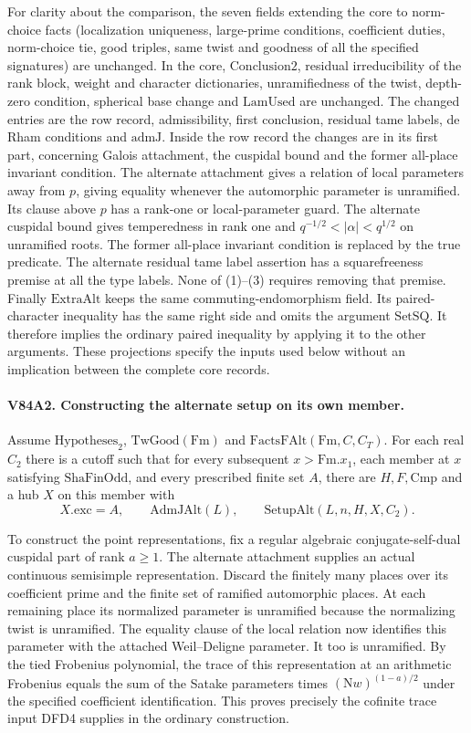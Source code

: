 For clarity about the comparison, the seven fields extending the
core to norm-choice facts (localization uniqueness, large-prime
conditions, coefficient duties, norm-choice tie, good triples, same
twist and goodness of all the specified signatures) are unchanged.
In the core, $\mathrm{Conclusion2}$, residual irreducibility of the
rank block, weight and character dictionaries, unramifiedness of
the twist, depth-zero condition, spherical base change and
$\mathrm{LamUsed}$ are unchanged. The changed entries are the
row record, admissibility, first conclusion, residual tame labels,
de Rham conditions and $\mathrm{admJ}$. Inside the row record
the changes are in its first part, concerning Galois attachment,
the cuspidal bound and the former all-place invariant condition.
The alternate attachment gives a relation of local parameters
away from $p$, giving equality whenever the automorphic parameter
is unramified. Its clause above $p$ has a rank-one or local-parameter
guard. The alternate cuspidal bound gives temperedness in rank one
and $q^{-1/2}<|\alpha|<q^{1/2}$ on unramified roots. The former
all-place invariant condition is replaced by the true predicate.
The alternate residual tame label assertion has a squarefreeness
premise at all the type labels. None of (1)--(3) requires removing
that premise. Finally $\mathrm{ExtraAlt}$ keeps the same
commuting-endomorphism field. Its paired-character inequality
has the same right side and omits the argument $\mathrm{SetSQ}$.
It therefore implies the ordinary paired inequality by applying
it to the other arguments. These projections specify the inputs
used below without an implication between the complete core records.

\paragraph{V84A2. Constructing the alternate setup on its own member.}
Assume $\mathrm{Hypotheses}_2$, $\mathrm{TwGood}(\mathrm{Fm})$ and
$\mathrm{FactsFAlt}(\mathrm{Fm},C,C_T)$. For each real $C_2$ there is
a cutoff such that for every subsequent $x>\mathrm{Fm}.x_1$, each
member at $x$ satisfying $\mathrm{ShaFinOdd}$, and every prescribed
finite set $A$, there are $H,F,\mathrm{Cmp}$ and a hub $X$ on this
member with
\[
 X.\mathrm{exc}=A,\qquad \mathrm{AdmJAlt}(L),\qquad
 \mathrm{SetupAlt}(L,n,H,X,C_2).
\]

To construct the point representations, fix a regular algebraic
conjugate-self-dual cuspidal part of rank $a\ge1$. The alternate
attachment supplies an actual continuous semisimple representation.
Discard the finitely many places over its coefficient prime and
the finite set of ramified automorphic places. At each remaining
place its normalized parameter is unramified because the
normalizing twist is unramified. The equality clause of the
local relation now identifies this parameter with the attached
Weil--Deligne parameter. It too is unramified. By the tied
Frobenius polynomial, the trace of this representation at an
arithmetic Frobenius equals the sum of the Satake parameters
times $(\mathrm Nw)^{(1-a)/2}$ under the specified coefficient
identification. This proves precisely the cofinite trace input
DFD4 supplies in the ordinary construction.

